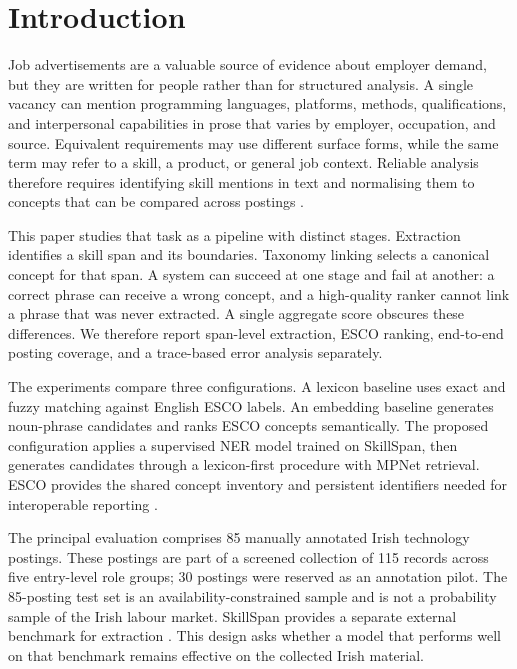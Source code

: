 \documentclass[conference]{IEEEtran}
\begin{document}
\section{Introduction}
Job advertisements are a valuable source of evidence about employer demand, but they are written for people rather than for structured analysis. A single vacancy can mention programming languages, platforms, methods, qualifications, and interpersonal capabilities in prose that varies by employer, occupation, and source. Equivalent requirements may use different surface forms, while the same term may refer to a skill, a product, or general job context. Reliable analysis therefore requires identifying skill mentions in text and normalising them to concepts that can be compared across postings \cite{Khaouja2021,Rahhal2024,Senger2024}.

This paper studies that task as a pipeline with distinct stages. Extraction identifies a skill span and its boundaries. Taxonomy linking selects a canonical concept for that span. A system can succeed at one stage and fail at another: a correct phrase can receive a wrong concept, and a high-quality ranker cannot link a phrase that was never extracted. A single aggregate score obscures these differences. We therefore report span-level extraction, ESCO ranking, end-to-end posting coverage, and a trace-based error analysis separately.

The experiments compare three configurations. A lexicon baseline uses exact and fuzzy matching against English ESCO labels. An embedding baseline generates noun-phrase candidates and ranks ESCO concepts semantically. The proposed configuration applies a supervised NER model trained on SkillSpan, then generates candidates through a lexicon-first procedure with MPNet retrieval. ESCO provides the shared concept inventory and persistent identifiers needed for interoperable reporting \cite{ESCOPortal,ESCOClassification}.

The principal evaluation comprises 85 manually annotated Irish technology postings. These postings are part of a screened collection of 115 records across five entry-level role groups; 30 postings were reserved as an annotation pilot. The 85-posting test set is an availability-constrained sample and is not a probability sample of the Irish labour market. SkillSpan provides a separate external benchmark for extraction \cite{SkillSpan2022}. This design asks whether a model that performs well on that benchmark remains effective on the collected Irish material.
\end{document}
